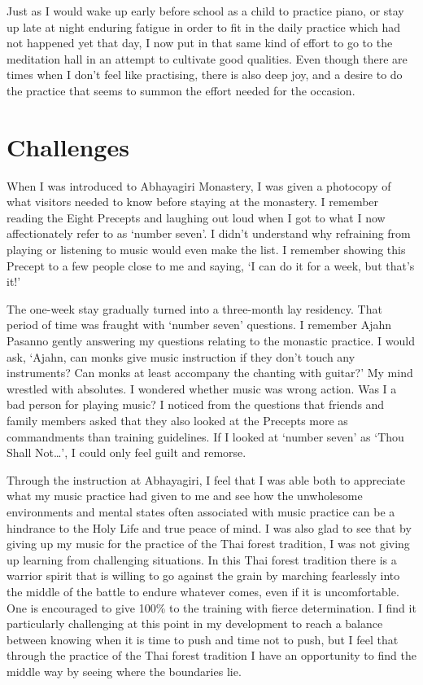 Just as I would wake up early before school as a
child to practice piano, or stay up late at night enduring fatigue in
order to fit in the daily practice which had not happened yet that day, 
I now put in that same kind of effort to go to the meditation hall in an
attempt to cultivate good qualities. Even though there are times when I
don't feel like practising, there is also deep joy, and a desire to do
the practice that seems to summon the effort needed for the occasion. 

\section{Challenges}

When I was introduced to Abhayagiri Monastery, I was given a photocopy
of what visitors needed to know before staying at the monastery. I
remember reading the Eight Precepts and laughing out loud when I got to
what I now affectionately refer to as `number seven'. I didn't
understand why refraining from playing or listening to music would even
make the list. I remember showing this Precept to a few people close to
me and saying, `I can do it for a week, but that's it!'

The one-week stay gradually turned into a three-month lay residency. 
That period of time was fraught with `number seven' questions. I
remember Ajahn Pasanno gently answering my questions relating to the
monastic practice. I would ask, `Ajahn, can monks give music instruction
if they don't touch any instruments? Can monks at least accompany the
chanting with guitar?' My mind wrestled with absolutes. I wondered
whether music was wrong action. Was I a bad person for playing music? I
noticed from the questions that friends and family members asked that
they also looked at the Precepts more as commandments than training
guidelines. If I looked at `number seven' as `Thou Shall Not\ldots{}', I
could only feel guilt and remorse.

Through the instruction at
Abhayagiri, I feel that I was able both to appreciate what my music
practice had given to me and see how the unwholesome environments and
mental states often associated with music practice can be a hindrance to
the Holy Life and true peace of mind. I was also glad to see that by
giving up my music for the practice of the Thai forest tradition, I was
not giving up learning from challenging situations. In this Thai forest
tradition there is a warrior spirit that is willing to go against the
grain by marching fearlessly into the middle of the battle to endure
whatever comes, even if it is uncomfortable. One is encouraged to give
100\% to the training with fierce determination. I find it particularly
challenging at this point in my development to reach a balance between
knowing when it is time to push and time not to push, but I feel that
through the practice of the Thai forest tradition I have an opportunity
to find the middle way by seeing where the boundaries lie. 

